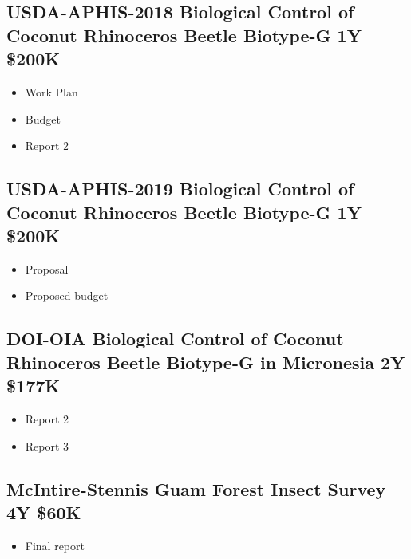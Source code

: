 \subsection{USDA-APHIS-2018 Biological Control of Coconut Rhinoceros Beetle Biotype-G 1Y \$200K}
\label{USDA-APHIS-2018}
\begin{refsection}
	\begin{itemize}
		\item Work Plan \cite{moore_farm_2018-1} 
		\item Budget \cite{moore_fy18_2018} 
		\item Report 2 \cite{moore_usda_2019-1}
	\end{itemize}
	\printbibliography[heading=none]
\end{refsection}

\subsection{USDA-APHIS-2019 Biological Control of Coconut Rhinoceros Beetle Biotype-G 1Y \$200K}
\label{USDA-APHIS-2019}
\begin{refsection}
	\begin{itemize}
		\item Proposal \cite{moore_fy19_2018}
		\item Proposed budget \cite{moore_fy19_2018-1}
	\end{itemize}
	\printbibliography[heading=none]
\end{refsection}

\subsection{DOI-OIA Biological Control of Coconut Rhinoceros Beetle Biotype-G in Micronesia 2Y \$177K}
\label{DOI}
\begin{refsection}
	\begin{itemize}
		\item Report 2 \cite{moore_doi-oia_2018}
		\item Report 3 \cite{moore_doi-oia_2019}
	\end{itemize}		
	\printbibliography[heading=none]
\end{refsection}

\subsection{McIntire-Stennis Guam Forest Insect Survey 4Y \$60K}
\label{McIntire-Stennis Guam Forest Insect Survey}
\begin{refsection}
	\begin{itemize}
		\item Final report \cite{moore_aubreymoore/mcintire-stennis_2018}
	\end{itemize}
	\printbibliography[heading=none]
\end{refsection}

